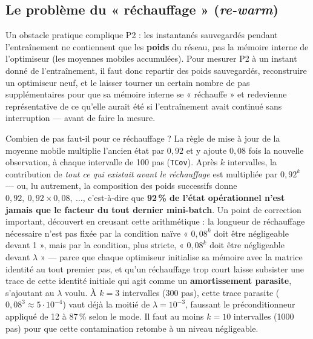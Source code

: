 \documentclass[11pt,a4paper]{article}
\newcommand{\eng}[1]{\emph{#1}}
\begin{document}
\subsection{Le problème du « réchauffage » (\eng{re-warm})}

Un obstacle pratique complique P2 : les instantanés sauvegardés pendant l'entraînement ne contiennent
que les \textbf{poids} du réseau, pas la mémoire interne de l'optimiseur (les moyennes mobiles
accumulées). Pour mesurer P2 à un instant donné de l'entraînement, il faut donc repartir des poids
sauvegardés, reconstruire un optimiseur neuf, et le laisser tourner un certain nombre de pas
supplémentaires pour que sa mémoire interne se « réchauffe » et redevienne représentative de ce
qu'elle aurait été si l'entraînement avait continué sans interruption — avant de faire la mesure.

Combien de pas faut-il pour ce réchauffage ? La règle de mise à jour de la moyenne mobile multiplie
l'ancien état par $0{,}92$ et y ajoute $0{,}08$ fois la nouvelle observation, à chaque intervalle de
100 pas (\texttt{TCov}). Après $k$ intervalles, la contribution de \emph{tout ce qui existait avant
le réchauffage} est multipliée par $0{,}92^k$ — ou, lu autrement, la composition des poids successifs
donne $0{,}92,\ 0{,}92\times0{,}08,\ \dots$, c'est-à-dire que \textbf{92\,\% de l'état opérationnel
n'est jamais que le facteur du tout dernier mini-batch}. Un point de correction important, découvert
en creusant cette arithmétique : la longueur de réchauffage nécessaire n'est pas fixée par la
condition naïve « $0{,}08^k$ doit être négligeable devant 1 », mais par la condition, plus stricte,
« $0{,}08^k$ doit être négligeable devant $\lambda$ » — parce que chaque optimiseur initialise sa
mémoire avec la matrice identité au tout premier pas, et qu'un réchauffage trop court laisse
subsister une trace de cette identité initiale qui agit comme un \textbf{amortissement parasite},
s'ajoutant au $\lambda$ voulu. À $k=3$ intervalles (300 pas), cette trace parasite
($0{,}08^3\approx 5\cdot10^{-4}$) vaut déjà la moitié de $\lambda=10^{-3}$, faussant le
préconditionneur appliqué de 12 à 87\,\% selon le mode. Il faut au moins $k=10$ intervalles (1000
pas) pour que cette contamination retombe à un niveau négligeable.
\end{document}
